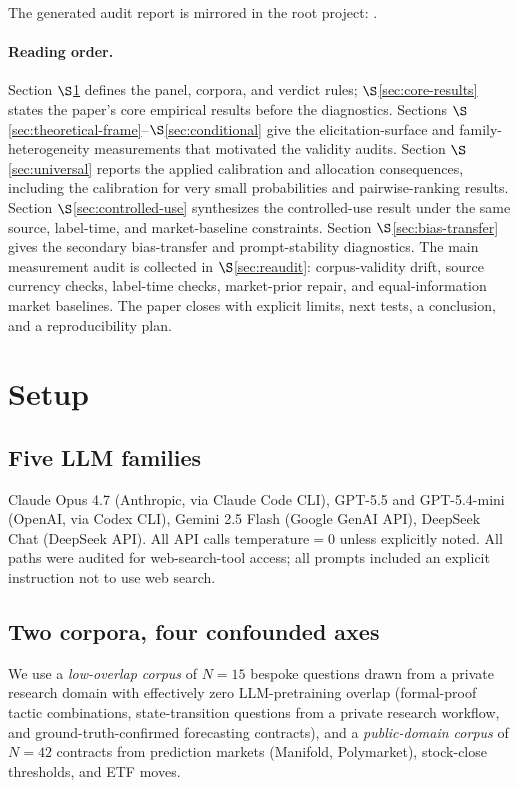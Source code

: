 \documentclass[11pt]{article}
\begin{document}
The generated audit report is mirrored in the root project:
{\scriptsize{}.}

\paragraph{Reading order.} Section $\S$\ref{sec:setup} defines the panel, corpora, and verdict rules; $\S$\ref{sec:core-results} states the paper's core empirical results before the diagnostics. Sections $\S$\ref{sec:theoretical-frame}--$\S$\ref{sec:conditional} give the elicitation-surface and family-heterogeneity measurements that motivated the validity audits. Section $\S$\ref{sec:universal} reports the applied calibration and allocation consequences, including the calibration for very small probabilities and pairwise-ranking results. Section $\S$\ref{sec:controlled-use} synthesizes the controlled-use result under the same source, label-time, and market-baseline constraints. Section $\S$\ref{sec:bias-transfer} gives the secondary bias-transfer and prompt-stability diagnostics. The main measurement audit is collected in $\S$\ref{sec:reaudit}: corpus-validity drift, source currency checks, label-time checks, market-prior repair, and equal-information market baselines. The paper closes with explicit limits, next tests, a conclusion, and a reproducibility plan.

\section{Setup}
\label{sec:setup}

\subsection{Five LLM families}
Claude Opus 4.7 (Anthropic, via Claude Code CLI), GPT-5.5 and GPT-5.4-mini (OpenAI, via Codex CLI), Gemini 2.5 Flash (Google GenAI API), DeepSeek Chat (DeepSeek API). All API calls $\text{temperature}{=}0$ unless explicitly noted. All paths were audited for web-search-tool access; all prompts included an explicit instruction not to use web search.

\subsection{Two corpora, four confounded axes}
\label{sec:corpora}

We use a \emph{low-overlap corpus} of $N{=}15$ bespoke questions drawn from a private research domain with effectively zero LLM-pretraining overlap (formal-proof tactic combinations, state-transition questions from a private research workflow, and ground-truth-confirmed forecasting contracts), and a \emph{public-domain corpus} of $N{=}42$ contracts from prediction markets (Manifold, Polymarket), stock-close thresholds, and ETF moves.
\end{document}
